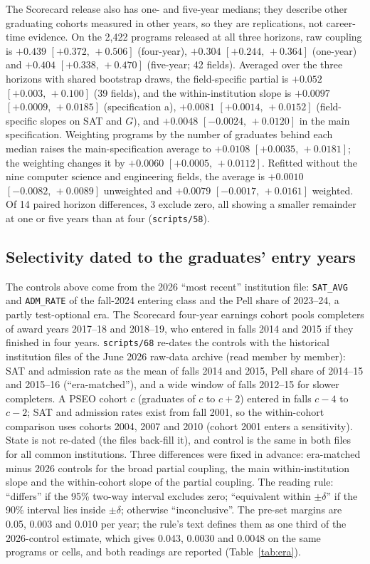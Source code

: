 \documentclass[11pt]{article}
\newcommand{\ci}[2]{$[#1,\allowbreak\,#2]$}
\newcommand{\scr}[1]{\texttt{scripts/#1}}
\begin{document}
The Scorecard release also has one- and five-year medians; they describe other graduating cohorts measured in
other years, so they are replications, not career-time evidence. On the 2,422 programs released at all three
horizons, raw coupling is $+0.439$ \ci{+0.372}{+0.506} (four-year), $+0.304$ \ci{+0.244}{+0.364} (one-year) and
$+0.404$ \ci{+0.338}{+0.470} (five-year; 42 fields). Averaged over the three horizons with shared bootstrap draws,
the field-specific partial is $+0.052$ \ci{+0.003}{+0.100} (39 fields), and the within-institution slope is
$+0.0097$ \ci{+0.0009}{+0.0185} (specification a), $+0.0081$ \ci{+0.0014}{+0.0152} (field-specific slopes on SAT and
$G$), and $+0.0048$ \ci{-0.0024}{+0.0120} in the main specification. Weighting programs by the number of graduates
behind each median raises the main-specification average to $+0.0108$ \ci{+0.0035}{+0.0181}; the weighting changes
it by $+0.0060$ \ci{+0.0005}{+0.0112}. Refitted without the nine computer science and engineering fields, the
average is $+0.0010$ \ci{-0.0082}{+0.0089} unweighted and $+0.0079$ \ci{-0.0017}{+0.0161} weighted. Of 14 paired
horizon differences, 3 exclude zero, all showing a smaller remainder at one or five years than at four
(\scr{58}).

\subsection{Selectivity dated to the graduates' entry years}\label{sec:era}

The controls above come from the 2026 ``most recent'' institution file: \texttt{SAT\_AVG} and \texttt{ADM\_RATE} of the
fall-2024 entering class and the Pell share of 2023--24, a partly test-optional era. The Scorecard four-year earnings
cohort pools completers of award years 2017--18 and 2018--19, who entered in falls 2014 and 2015 if they finished in
four years. \scr{68} re-dates the controls with the historical institution files of the June 2026 raw-data archive
(read member by member): SAT and admission rate as the mean of falls 2014 and 2015, Pell share of 2014--15 and
2015--16 (``era-matched''), and a wide window of falls 2012--15 for slower completers. A PSEO cohort $c$ (graduates
of $c$ to $c+2$) entered in falls $c-4$ to $c-2$; SAT and admission rates exist from fall 2001, so the within-cohort
comparison uses cohorts 2004, 2007 and 2010 (cohort 2001 enters a sensitivity). State is not re-dated (the files
back-fill it), and control is the same in both files for all common institutions. Three differences were fixed in
advance: era-matched minus 2026 controls for the broad partial coupling, the main within-institution slope and the
within-cohort slope of the partial coupling. The reading rule: ``differs'' if the 95\% two-way interval excludes zero;
``equivalent within $\pm\delta$'' if the 90\% interval lies inside $\pm\delta$; otherwise ``inconclusive''. The
pre-set margins are 0.05, 0.003 and 0.010 per year; the rule's text defines them as one third of the 2026-control
estimate, which gives 0.043, 0.0030 and 0.0048 on the same programs or cells, and both readings are reported
(Table~\ref{tab:era}).
\end{document}
